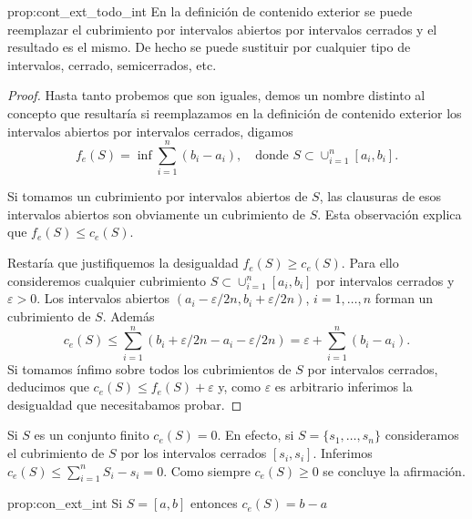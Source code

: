  \begin{proposicion}{prop:cont_ext_todo_int} En la definición de contenido exterior se puede reemplazar el cubrimiento por intervalos abiertos por intervalos cerrados y el resultado es el mismo. De hecho se puede sustituir por cualquier tipo de intervalos, cerrado, semicerrados, etc. 
  
 \end{proposicion}

 \begin{proof} Hasta tanto probemos que son iguales, demos un  nombre distinto al concepto que resultaría  si reemplazamos en la definición de  contenido exterior los  intervalos abiertos por intervalos cerrados, digamos 
   \[
  f_e(S)=\inf \sum_{i=1}^n (b_i-a_i),\quad \text{donde } S \subset \cup_{i=1}^n[a_{i},b_i].
 \]
 
 Si tomamos un cubrimiento por intervalos  abiertos de $S$, las clausuras de esos intervalos  abiertos son obviamente un cubrimiento de $S$. Esta observación explica que $f_e(S)\leq c_e(S)$. 
 
 Restaría que justifiquemos la desigualdad $f_e(S)\geq c_e(S)$.  Para ello consideremos cualquier cubrimiento $S \subset \cup_{i=1}^n[a_{i},b_i]$ por intervalos cerrados y $\varepsilon>0$. Los intervalos abiertos $(a_{i}-\varepsilon/2n,b_i+\varepsilon/2n)$, $i=1,\ldots,n$ forman un cubrimiento de $S$. Además
 \[
   c_e(S)\leq \sum_{i=1}^n (b_i+\varepsilon/2n-a_i-\varepsilon/2n)=\varepsilon+\sum_{i=1}^n (b_i-a_i).   
 \]
Si tomamos ínfimo sobre todos los cubrimientos de $S$ por intervalos cerrados, deducimos que $c_e(S)\leq f_e(S)+\varepsilon$ y, como $\varepsilon$ es arbitrario inferimos la desigualdad que necesitabamos probar.  \end{proof}

 
 
 
 \begin{ejemplo}{} Si $S$ es un conjunto finito $c_e(S)=0$. En efecto, si $S=\{s_1,\ldots,s_n\}$ consideramos el cubrimiento de $S$ por los intervalos cerrados $[s_i,s_i]$. Inferimos $c_e(S)\leq \sum_{i=1}^nS_i-s_i=0$. Como siempre $c_e(S)\geq 0$ se concluye la afirmación.  
  
 \end{ejemplo}

 \begin{proposicion}{prop:con_ext_int} Si $S=[a,b]$ entonces  $c_e(S)=b-a$ 
\end{proposicion}

